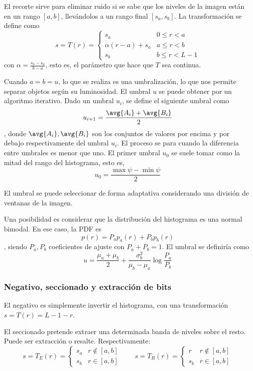 \documentclass[nochap,palatino]{apuntes}
\begin{document}
El recorte sirve para eliminar ruido si se sabe que los niveles de la imagen están en un rango $[a,b]$, llevándolos a un rango final $[s_a, s_b]$. La transformación se define como \[ s = T(r) = \begin{cases} s_a & 0 ≤ r < a \\
α(r - a) + s_a & a ≤ r < b \\
s_b & b ≤ r < L - 1
\end{cases} \] con $α = \frac{s_b - s_a}{b - a}$, esto es, el parámetro que hace que $T$ sea continua.

Cuando $a = b = u$, lo que se realiza es una umbralización, lo que nos permite separar objetos según su luminosidad. El umbral $u$ se puede obtener por un algoritmo iterativo. Dado un umbral $u_i$, se define el siguiente umbral como \[ u_{i + 1} = \frac{\avg{A_i} + \avg{B_i}}{2}\], donde $\avg{A_i}, \avg{B_i}$ son los conjuntos de valores por encima y por debajo respectivamente del umbral $u_i$. El proceso se para cuando la diferencia entre umbrales es menor que uno. El primer umbral $u_0$ se suele tomar como la mitad del rango del histograma, esto es, \[ u_0 = \frac{\max ψ - \min ψ}{2} \]

El umbral se puede seleccionar de forma adaptativa considerando una división de ventanas de la imagen.

Una posibilidad es considerar que la distribución del histograma es una normal bimodal. En ese caso, la PDF es \[ p(r) = P_a p_a(r) + P_b p_b(r) \], siendo $P_a, P_b$ coeficientes de ajuste con $P_a + P_b = 1$. El umbral se definiría como \[ u = \frac{μ_a + μ_b}{2} + \frac{σ_b^2}{μ_b - μ_a} \log \frac{P_a}{P_b} \]

\subsubsection{Negativo, seccionado y extracción de bits}

El negativo es simplemente invertir el histograma, con una transformación $s = T(r) = L - 1 - r$.

El seccionado pretende extraer una determinada banda de niveles sobre el resto. Puede ser extracción o resalte. Respectivamente: \[ s = T_E(r) =
\begin{cases}
s_a & r ∉ [a,b] \\
s_b & r ∈ [a,b]
\end{cases} \qquad
s=T_R(r) = \begin{cases}
r & r ∉ [a,b] \\
s_b & r ∈ [a,b]
\end{cases}
\]
\end{document}
